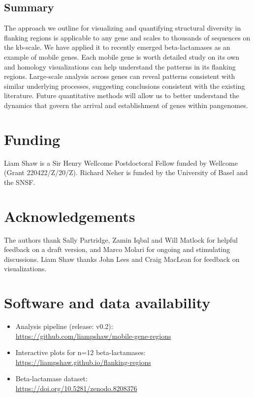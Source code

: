 \documentclass[rmp,superscriptaddress,11pt]{revtex4-1}
\begin{document}
\subsection*{Summary}

\noindent The approach we outline for visualizing and quantifying structural diversity in flanking regions is applicable to any gene and scales to thousands of sequences on the kb-scale. We have applied it to recently emerged beta-lactamases as an example of mobile genes. Each mobile gene is worth detailed study on its own and homology visualizations can help understand the patterns in its flanking regions. Large-scale analysis across genes can reveal patterns consistent with similar underlying processes, suggesting conclusions consistent with the existing literature. Future quantitative methods will allow us to better understand the dynamics that govern the arrival and establishment of genes within pangenomes. 

\section*{Funding}

\noindent Liam Shaw is a Sir Henry Wellcome Postdoctoral Fellow funded by Wellcome (Grant 220422/Z/20/Z). Richard Neher is funded by the University of Basel and the SNSF. 

\section*{Acknowledgements}

\noindent The authors thank Sally Partridge, Zamin Iqbal and Will Matlock for helpful feedback on a draft version, and Marco Molari for ongoing and stimulating discussions. Liam Shaw thanks John Lees and Craig MacLean for feedback on visualizations. 

\newpage
\section*{Software and data availability}

\noindent \begin{itemize}
\item Analysis pipeline (release: v0.2): \\\href{https://github.com/liampshaw/mobile-gene-regions}{https://github.com/liampshaw/mobile-gene-regions}
\item Interactive plots for n=12 beta-lactamases:\\\href{https://liampshaw.github.io/flanking-regions}{https://liampshaw.github.io/flanking-regions}
\item Beta-lactamase dataset:\\\href{https://doi.org/10.5281/zenodo.8208376}{https://doi.org/10.5281/zenodo.8208376}
\end{itemize}
\end{document}
